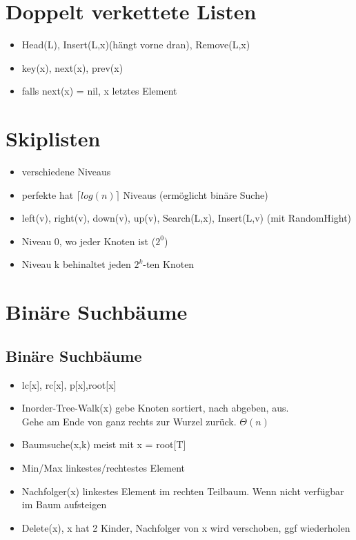 \documentclass{article}
\begin{document}
\section{Doppelt verkettete Listen}
\begin{itemize}
\item Head(L), Insert(L,x)(h{\"a}ngt vorne dran), Remove(L,x)
\item key(x), next(x), prev(x)
\item falls next(x) = nil, x letztes Element
\end{itemize}

\section{Skiplisten}
\begin{itemize}
\item verschiedene Niveaus 
\item perfekte hat $ \lceil  log(n)\rceil$ Niveaus (erm{\"o}glicht bin{\"a}re Suche)
\item left(v), right(v), down(v), up(v), Search(L,x), Insert(L,v) (mit RandomHight)
\item Niveau 0, wo jeder Knoten ist ($2^0$)
\item Niveau k behinaltet jeden $2^k$-ten Knoten
\end{itemize}

\section{Bin{\"a}re Suchb{\"a}ume}
\subsection{Bin{\"a}re Suchb{\"a}ume}
\begin{itemize}
\item lc[x], rc[x], p[x],root[x]
\item Inorder-Tree-Walk(x) gebe Knoten sortiert, nach abgeben, aus. \\ Gehe am Ende von ganz rechts zur Wurzel zur{\"u}ck. $\Theta(n)$
\item Baumsuche(x,k) meist mit x = root[T]
\item Min/Max linkestes/rechtestes Element
\item Nachfolger(x) linkestes Element im rechten Teilbaum. Wenn nicht verf{\"u}gbar im Baum aufsteigen
\item Delete(x), x hat 2 Kinder, Nachfolger von x wird verschoben, ggf wiederholen
\end{itemize}
\end{document}
